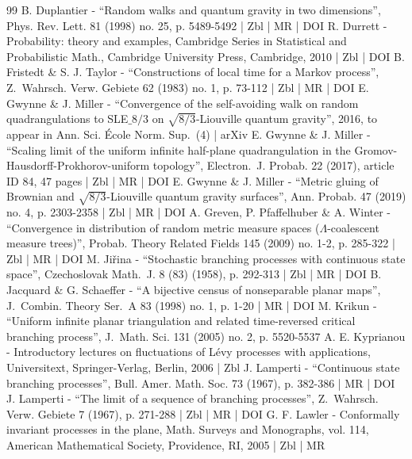 \documentclass[10pt]{amsart}
\theoremstyle{plain}
\numberwithin{theorem}{section}
\theoremstyle{definition}
\begin{document}
\begin{thebibliography}{99}
B. Duplantier - “Random walks and quantum gravity in two dimensions”, Phys. Rev. Lett. 81 (1998) no. 25, p. 5489-5492 | Zbl | MR | DOI
R. Durrett - Probability: theory and examples, Cambridge Series in Statistical and Probabilistic Math., Cambridge University Press, Cambridge, 2010 | Zbl | DOI
B. Fristedt \& S. J. Taylor - “Constructions of local time for a Markov process”, Z. Wahrsch. Verw. Gebiete 62 (1983) no. 1, p. 73-112 | Zbl | MR | DOI
E. Gwynne \& J. Miller - “Convergence of the self-avoiding walk on random quadrangulations to SLE$\_{8/3}$ on $\sqrt{8/3}$-Liouville quantum gravity”, 2016, to appear in Ann. Sci. École Norm. Sup. (4) | arXiv
E. Gwynne \& J. Miller - “Scaling limit of the uniform infinite half-plane quadrangulation in the Gromov-Hausdorff-Prokhorov-uniform topology”, Electron. J. Probab. 22 (2017), article ID 84, 47 pages | Zbl | MR | DOI
E. Gwynne \& J. Miller - “Metric gluing of Brownian and $\sqrt{8/3}$-Liouville quantum gravity surfaces”, Ann. Probab. 47 (2019) no. 4, p. 2303-2358 | Zbl | MR | DOI
A. Greven, P. Pfaffelhuber \& A. Winter - “Convergence in distribution of random metric measure spaces ($\Lambda $-coalescent measure trees)”, Probab. Theory Related Fields 145 (2009) no. 1-2, p. 285-322 | Zbl | MR | DOI
M. Jiřina - “Stochastic branching processes with continuous state space”, Czechoslovak Math. J. 8 (83) (1958), p. 292-313 | Zbl | MR | DOI
B. Jacquard \& G. Schaeffer - “A bijective census of nonseparable planar maps”, J. Combin. Theory Ser. A 83 (1998) no. 1, p. 1-20 | MR | DOI
M. Krikun - “Uniform infinite planar triangulation and related time-reversed critical branching process”, J. Math. Sci. 131 (2005) no. 2, p. 5520-5537
A. E. Kyprianou - Introductory lectures on fluctuations of Lévy processes with applications, Universitext, Springer-Verlag, Berlin, 2006 | Zbl
J. Lamperti - “Continuous state branching processes”, Bull. Amer. Math. Soc. 73 (1967), p. 382-386 | MR | DOI
J. Lamperti - “The limit of a sequence of branching processes”, Z. Wahrsch. Verw. Gebiete 7 (1967), p. 271-288 | Zbl | MR | DOI
G. F. Lawler - Conformally invariant processes in the plane, Math. Surveys and Monographs, vol. 114, American Mathematical Society, Providence, RI, 2005 | Zbl | MR

\end{thebibliography}
\end{document}
